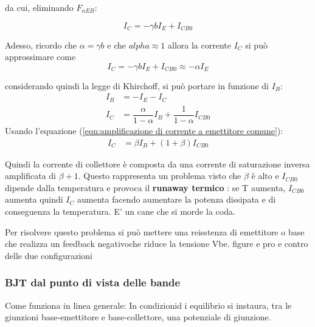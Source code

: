 da cui, eliminando $F_{nEB}$:

\begin{equation}
    I_C=-\gamma b I_E + I_{CB0}\label{eq:formula Ic ebers-moll}
\end{equation}

Adesso, ricordo che $\alpha = \gamma b $ e che $alpha \approx 1$ allora la corrente $I_C$ si può approssimare come
\begin{equation}
    I_C=-\gamma b I_E + I_{CB0} \approx - \alpha I_E
\end{equation}

considerando quindi la legge di Khirchoff, si può portare in funzione di $I_B$:
\begin{align}
    I_B&=-I_E-I_C \\
    I_C&= \dfrac{\alpha}{1-\alpha}I_B + \dfrac{1}{1-\alpha}I_{CB0} 
\end{align}
    Usando l'equazione (\ref{eqn:amplificazione di corrente a emettitore comune}):
\begin{align}
    I_C&= \beta I_B + (1+\beta)I_{CB0}
\end{align}

Quindi la corrente di collettore è composta da una corrente di saturazione inversa amplificata di $\beta +1$. Questo rappresenta un problema visto che $\beta$ è alto e $I_{CB0}$ dipende dalla temperatura e provoca il \textbf{ runaway termico} :
se T aumenta, $I_{CB0}$ aumenta quindi $I_C$ aumenta facendo aumentare la potenza dissipata e di conseguenza la temperatura. E' un cane che si morde la coda.\\

\begin{psbox}
    Per risolvere questo problema si può mettere una reisstenza di emettitore o base che realizza un feedback negativoche riduce la tensione Vbe.
    figure e pro e contro delle due configurazioni
\end{psbox}

\cleardoublepage
\subsubsection{BJT dal punto di vista delle bande}
Come funziona in linea generale:
In condizionid i equilibrio si instaura, tra le giunzioni base-emettitore e base-collettore, una potenziale di giunzione.

